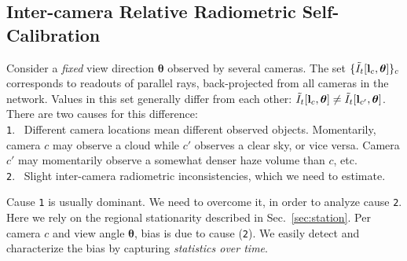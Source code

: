 \documentclass[runningheads]{llncs}
\begin{document}
\subsection*{Inter-camera Relative Radiometric Self-Calibration}
\label{sec:mutiradio}

%
%

Consider a {\em fixed} view direction ${\bm \theta}$ observed by several cameras.
The set $\{\tilde I_t[{\bf l}_c,{\bm \theta}]\}_c$ corresponds to readouts of parallel rays, back-projected from all cameras in the network. Values in this set generally differ from each other:
 $\tilde I_t[{\bf l}_c,{\bm \theta}]\neq \tilde I_t[{\bf l}_{c'},{\bm \theta}]$. There are two causes for this difference:\\
 {\tt 1}.~ Different camera locations mean different observed objects. Momentarily, camera $c$ may observe a cloud while $c'$ observes a clear sky, or vice versa. Camera $c'$ may momentarily observe a somewhat denser haze volume than $c$, etc. \\
 {\tt 2}.~ Slight inter-camera radiometric inconsistencies, which we need to estimate.\\
 \vspace{-0.2cm}

Cause {\tt 1} is usually dominant. We need to overcome it, in order to analyze cause {\tt 2}. Here we rely on the regional stationarity described in Sec.~\ref{sec:station}.
Per camera $c$ and view angle ${\bm \theta}$, bias is due to cause ({\tt 2}). We easily detect and characterize the bias by capturing {\em statistics over time}.
\end{document}
